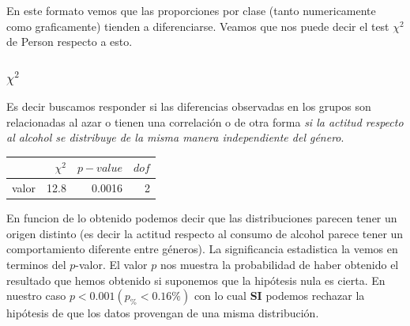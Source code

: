 \documentclass[8pt]{beamer}
\begin{document}
\begin{frame}
\begin{multicols}{2}
\begin{figure}
 \end{figure}
 \small{En este formato vemos que las proporciones por clase (tanto numericamente como graficamente) tienden a diferenciarse. Veamos que nos puede decir el test $\chi^2$ de Person respecto a esto.}
 \end{multicols}
\end{frame}

\begin{frame}\frametitle{$\chi^2$}
%
Es decir buscamos responder si las diferencias observadas en los grupos son relacionadas al azar o tienen una correlación o de otra forma \textit{si la actitud respecto al alcohol se distribuye de la misma manera independiente del género}. 
%
\begin{table}
\begin{tabular}{lrrr}
\toprule
{} &  $\chi^2$ &  $p-value$ &  $dof$  \\
\midrule
valor &        12.8 &       0.0016 &      2  \\
\bottomrule
\end{tabular}
\end{table} 
\pause
\begin{block}{}
En funcion de lo obtenido podemos decir que las distribuciones parecen tener un origen distinto (es decir la actitud respecto al consumo de alcohol parece tener un comportamiento diferente entre géneros). La significancia estadistica la vemos en terminos del $p$-valor. El valor $p$ nos muestra la probabilidad de haber obtenido el resultado que hemos obtenido si suponemos que la hipótesis nula es cierta.  En nuestro caso $p<0.001 (p_{\%}<0.16\%)$ con lo cual \textbf{SI} podemos rechazar la hipótesis de que los datos provengan de una misma distribución.
\end{block}
\end{frame}
\end{document}
